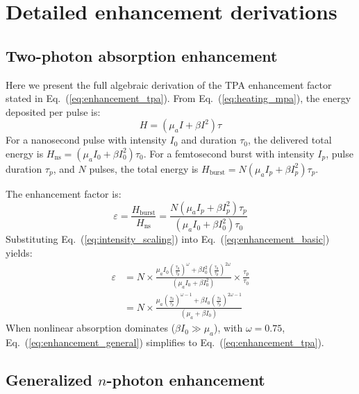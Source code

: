 \documentclass{optica-article}
\begin{document}
\appendix

\section{Detailed enhancement derivations}

\subsection{Two-photon absorption enhancement}

Here we present the full algebraic derivation of the TPA enhancement factor stated in Eq.~(\ref{eq:enhancement_tpa}). From Eq.~(\ref{eq:heating_mpa}), the energy deposited per pulse is:
\begin{equation}
H = (\mu_a I + \beta I^2)\tau
\label{eq:energy_per_pulse}
\end{equation}
For a nanosecond pulse with intensity $I_0$ and duration $\tau_0$, the delivered total energy is $H_\text{ns} = (\mu_a I_0 + \beta I_0^2)\tau_0$. For a femtosecond burst with intensity $I_p$, pulse duration $\tau_p$, and $N$ pulses, the total energy is $H_\text{burst} = N(\mu_a I_p + \beta I_p^2)\tau_p$.

The enhancement factor is:
\begin{equation}
\varepsilon = \frac{H_\text{burst}}{H_\text{ns}} = \frac{N(\mu_a I_p + \beta I_p^2)\tau_p}{(\mu_a I_0 + \beta I_0^2)\tau_0}
\label{eq:enhancement_basic}
\end{equation}
Substituting Eq.~(\ref{eq:intensity_scaling}) into Eq.~(\ref{eq:enhancement_basic}) yields:
\begin{align}
\varepsilon &= N \times \frac{\mu_a I_0 \left(\frac{\tau_0}{\tau_p}\right)^\omega + \beta I_0^2 \left(\frac{\tau_0}{\tau_p}\right)^{2\omega}}{(\mu_a I_0 + \beta I_0^2)} \times \frac{\tau_p}{\tau_0} \nonumber \\[10pt]
&= N \times \frac{\mu_a\left(\frac{\tau_0}{\tau_p}\right)^{\omega-1} + \beta I_0\left(\frac{\tau_0}{\tau_p}\right)^{2\omega-1}}{(\mu_a + \beta I_0)}
\label{eq:enhancement_general}
\end{align}
When nonlinear absorption dominates ($\beta I_0 \gg \mu_a$), with $\omega = 0.75$, Eq.~(\ref{eq:enhancement_general}) simplifies to Eq.~(\ref{eq:enhancement_tpa}).

\subsection{Generalized $n$-photon enhancement}
\end{document}
